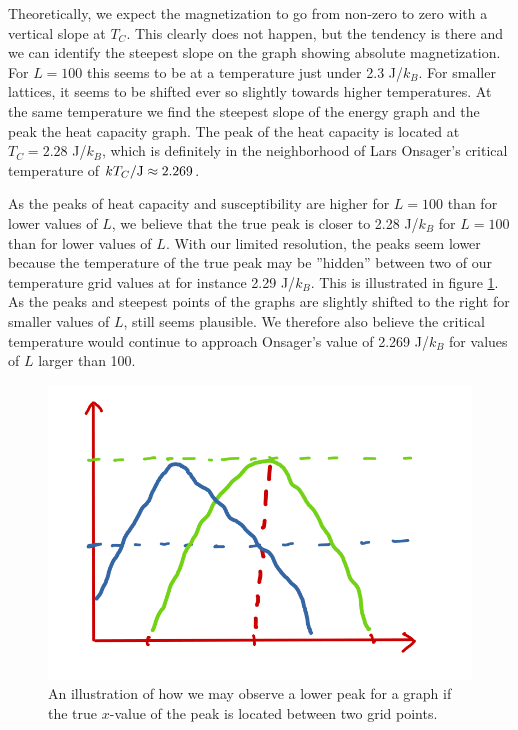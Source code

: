 \documentclass[reprint, english,notitlepage,nofootinbib]{revtex4-1}  %
\begin{document}
Theoretically, we expect the magnetization to go from non-zero to zero with a vertical slope at $T_C$. This clearly does not happen, but the tendency is there and we can identify the steepest slope on the graph showing absolute magnetization. For $L = 100$ this seems to be at a temperature just under 2.3 J/$k_B$. For smaller lattices, it seems to be shifted ever so slightly towards higher temperatures. At the same temperature we find the steepest slope of the energy graph and the peak the heat capacity graph. The peak of the heat capacity is located at $T_C = 2.28$ J/$k_B$, which is definitely in the neighborhood of Lars Onsager's critical temperature of $kT_C/\rm{J} \approx 2.269$.

As the peaks of heat capacity and susceptibility are higher for $L = 100$ than for lower values of $L$, we believe that the true peak is closer to 2.28 J/$k_B$ for $L = 100$ than for lower values of $L$. With our limited resolution, the peaks seem lower because the temperature of the true peak may be ''hidden'' between two of our temperature grid values at for instance 2.29 J/$k_B$. This is illustrated in figure \ref{fig:drawing_critical_temp}. As the peaks and steepest points of the graphs are slightly shifted to the right for smaller values of $L$, still seems plausible. We therefore also believe the critical temperature would continue to approach Onsager's value of 2.269 J/$k_B$ for values of $L$ larger than 100.
\begin{figure}
  \includegraphics[width=\linewidth]{../output/Drawing.png}
  \caption{An illustration of how we may observe a lower peak for a graph if the true $x$-value of the peak is located between two grid points.}
  \label{fig:drawing_critical_temp}
\end{figure}
\end{document}
